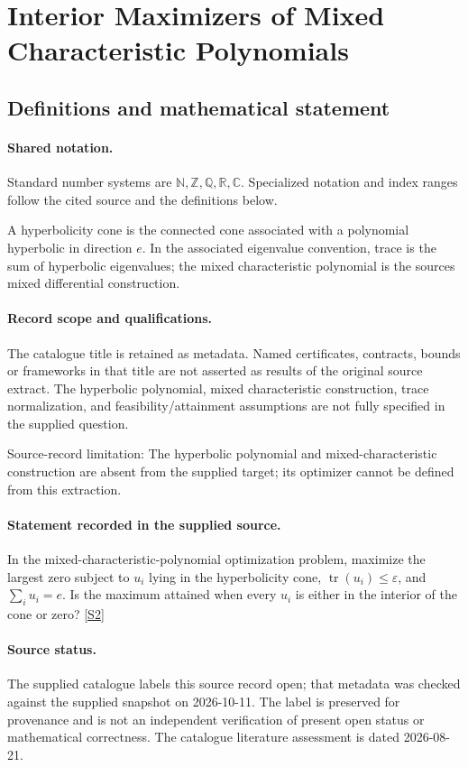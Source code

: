 \documentclass[11pt]{article}
\newcommand{\sref}[2]{\hyperlink{source:#1:#2}{[S#2]}}
\begin{document}
\section{Interior Maximizers of Mixed Characteristic Polynomials}\label{statement}

\subsection{Definitions and mathematical statement}

\paragraph{Shared notation.}Standard number systems are $\mathbb N,\mathbb Z,\mathbb Q,\mathbb R,\mathbb C$. Specialized notation and index ranges follow the cited source and the definitions below.


A hyperbolicity cone is the connected cone associated with a polynomial hyperbolic in direction $e$. In the associated eigenvalue convention, trace is the sum of hyperbolic eigenvalues; the mixed characteristic polynomial is the source\textquotesingle s mixed differential construction.
\paragraph{Record scope and qualifications.}
The catalogue title is retained as metadata. Named certificates, contracts, bounds or frameworks in that title are not asserted as results of the original source extract.
The hyperbolic polynomial, mixed characteristic construction, trace normalization, and feasibility/attainment assumptions are not fully specified in the supplied question.

Source-record limitation: The hyperbolic polynomial and mixed-characteristic construction are absent from the supplied target; its optimizer cannot be defined from this extraction.
\paragraph{Statement recorded in the supplied source.}
In the mixed-characteristic-polynomial optimization problem, maximize the largest zero subject to $u_i$ lying in the hyperbolicity cone, $\operatorname{tr}(u_i)\leq\varepsilon$, and $\sum_i u_i=e$. Is the maximum attained when every $u_i$ is either in the interior of the cone or zero? \sref{statement}{2}
\paragraph{Source status.}
The supplied catalogue labels this source record open; that metadata was checked against the supplied snapshot on 2026-10-11. The label is preserved for provenance and is not an independent verification of present open status or mathematical correctness. The catalogue literature assessment is dated 2026-08-21.
\end{document}
